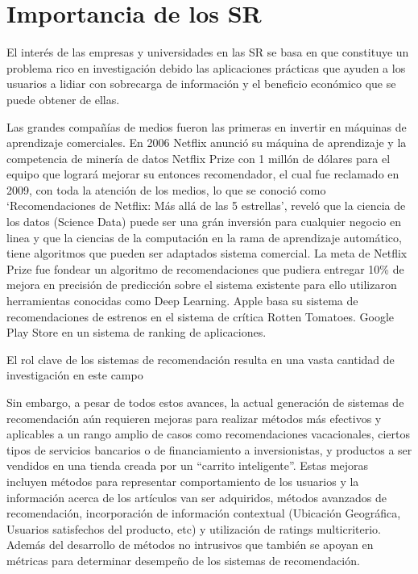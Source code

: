 \section{Importancia de los SR}

El interés  de las empresas y universidades en las SR se basa en que  constituye un
problema rico en investigación  debido las  aplicaciones
prácticas que ayuden a los usuarios a lidiar con sobrecarga de
información y el beneficio económico que se puede obtener de ellas.

Las grandes compañías de medios fueron las primeras en invertir en
máquinas de aprendizaje comerciales. En 2006 Netflix anunció su máquina
de aprendizaje y la competencia de minería de datos Netflix Prize con 1 millón de
dólares para el equipo que logrará mejorar su entonces recomendador, el cual fue reclamado en 2009, con toda la atención de
los medios, lo que se conoció como `Recomendaciones de Netflix: Más allá
de las 5 estrellas', reveló  que la ciencia de los datos (Science Data) puede ser una grán inversión para cualquier negocio en linea y que la ciencias de la computación en la rama de aprendizaje automático, tiene algoritmos que pueden ser adaptados sistema comercial. La meta de Netflix Prize
fue fondear un algoritmo de recomendaciones que pudiera entregar 10\% de
mejora en precisión de predicción sobre el sistema existente para ello utilizaron herramientas conocidas como Deep Learning. Apple basa
su sistema de recomendaciones de estrenos en el sistema de crítica
Rotten Tomatoes. Google Play Store en un sistema de ranking de
aplicaciones.

El rol clave de los sistemas de recomendación resulta en una vasta
cantidad de investigación en este campo

Sin embargo, a pesar de todos estos avances, la actual generación de
sistemas de recomendación aún requieren mejoras para realizar métodos
más efectivos y aplicables a un rango amplio de casos como
recomendaciones vacacionales, ciertos tipos de servicios bancarios o de
financiamiento a inversionistas, y productos a ser vendidos en una
tienda creada por un ``carrito inteligente''. 
Estas mejoras
incluyen  métodos para representar comportamiento  de los usuarios y la
información acerca de los artículos van ser adquiridos, métodos avanzados
de recomendación, incorporación de información contextual (Ubicación Geográfica, Usuarios satisfechos del producto, etc) y utilización
de ratings multicriterio. Además del desarrollo de métodos no
intrusivos que también se apoyan en métricas para determinar desempeño
de los sistemas de recomendación.
